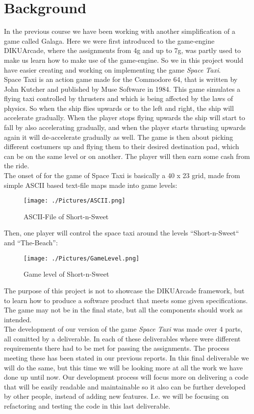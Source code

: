 \documentclass[../master.tex]{subfiles}
\begin{document}
\section{Background}
In the previous course we have been working with another simplification of a game called Galaga. Here we were first introduced to the game-engine DIKUArcade, where the assignments from 4g and up to 7g, was partly used to make us learn how to make use of the game-engine. So we in this project would have easier creating and working on implementing the game \textit{Space Taxi}.\\

Space Taxi is an action game made for the Commodore 64, that is written by John Kutcher and published by Muse Software in 1984. This game simulates a flying taxi controlled by thrusters and which is being affected by the laws of physics. So when the ship flies upwards or to the left and right, the ship will accelerate gradually. When the player stops flying upwards the ship will start to fall by also accelerating gradually, and when the player starts thrusting upwards again it will de-accelerate gradually as well. The game is then about picking different costumers up and flying them to their desired destination pad, which can be on the same level or on another. The player will then earn some cash from the ride.\\

The onset of for the game of Space Taxi is basically a 40 x 23 grid, made from simple ASCII based text-file maps made into game levels:
\begin{figure}[h]
	\centering
	\texttt{[image: ./Pictures/ASCII.png]}
    \caption{ASCII-File of Short-n-Sweet}
\end{figure}

\newpage

Then, one player will control the space taxi around the levels ``Short-n-Sweet`` and ``The-Beach'':
\begin{figure}[h]
	\centering
	\texttt{[image: ./Pictures/GameLevel.png]}
    \caption{Game level of Short-n-Sweet}
\end{figure}

The purpose of this project is not to showcase the DIKUArcade framework, but to learn how to produce a software product that meets some given specifications. The game may not be in the final state, but all the components should work as intended.\\

The development of our version of the game \textit{Space Taxi} was made over 4 parts, all comitted by a deliverable. In each of these deliverables where were different requirements there had to be met for passing the assignments. The process meeting these has been stated in our previous reports. In this final deliverable we will do the same, but this time we will be looking more at all the work we have done up until now. Our development process will focus more on delivering a code that will be easily readable and maintainable so it also can be further developed by other people, instead of adding new features. I.e. we will be focusing on refactoring and testing the code in this last deliverable.
\end{document}

